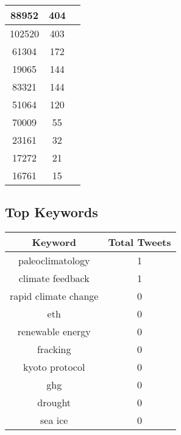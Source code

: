 \documentclass{article}\usepackage[T1]{fontenc}
\begin{document}
\begin{tabular}{|c|c|c|}
 \hline
88952 & 404\\ 
 \hline
102520 & 403\\ 
 \hline
61304 & 172\\ 
 \hline
19065 & 144\\ 
 \hline
83321 & 144\\ 
 \hline
51064 & 120\\ 
 \hline
70009 & 55\\ 
 \hline
23161 & 32\\ 
 \hline
17272 & 21\\ 
 \hline
16761 & 15\\ 
 \hline
\end{tabular}\subsection*{Top Keywords}\begin{tabular}{|c|c|}         \hline         Keyword & Total Tweets \\ 
 \hline
paleoclimatology & 1\\ 
 \hline
climate feedback & 1\\ 
 \hline
rapid climate change & 0\\ 
 \hline
eth & 0\\ 
 \hline
renewable energy & 0\\ 
 \hline
fracking & 0\\ 
 \hline
kyoto protocol & 0\\ 
 \hline
ghg & 0\\ 
 \hline
drought & 0\\ 
 \hline
sea ice & 0\\ 
 \hline
\end{tabular}
\end{document}
